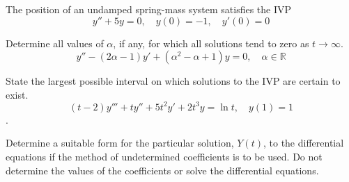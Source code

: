 \documentclass[12pt]{exam}
\begin{document}
\begin{questions}
        
        
    \newpage \InitialsLeft
        
    \question[10] The position of an undamped spring-mass system satisfies the IVP $$y'' + 5y = 0, \quad y(0) = -1, \quad y'(0) = 0$$  
    
    \newpage \InitialsRight
    
    \question[2] Determine all values of $\alpha$, if any, for which all solutions tend to zero as $t\to\infty$. $$y'' - (2\alpha - 1) y' + (\alpha^2-\alpha+1) y = 0, \quad \alpha \in \mathbb R$$ \vspace{5cm}  %
    
    
    \question[2] %
    State the largest possible interval on which solutions to the IVP are certain to exist. $$(t-2)y'''+ty''+5t^2y'+2t^3y = \ln t, \quad y(1) = 1$$.
    \vspace{3cm}
    

    \newpage \InitialsLeft
    \question[7]  Determine a suitable form for the particular solution, $Y(t)$, to the differential equations if the method of undetermined coefficients is to be used. Do not determine the values of the coefficients or solve the differential equations. 
    



\end{questions}
\end{document}
